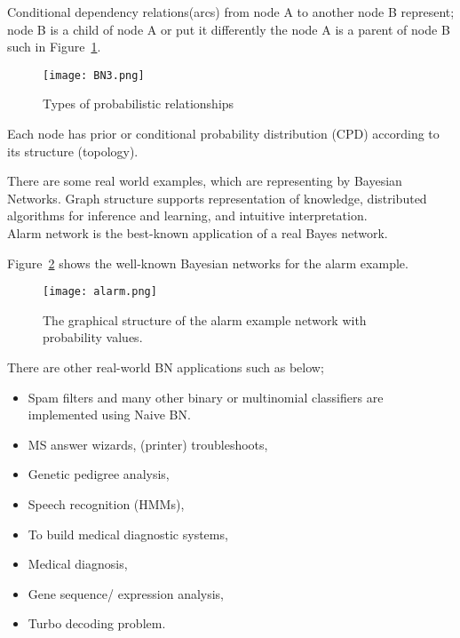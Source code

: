 \documentclass[a4,12pt]{ozu-thesis}
\begin{document}
 Conditional dependency relations(arcs) from node A to another node B represent; node B is a child of node A or put it differently the node A is a parent of node B such in Figure~\ref{fig:prob}.


\begin{figure}[h]
\begin{center}
\texttt{[image: BN3.png]}
\end{center}
\caption{Types of probabilistic relationships \cite{cmu1}}
\label{fig:prob}
\end{figure}

 Each node has prior or conditional probability distribution (CPD) according to its structure (topology).


 There are some real world examples, which are representing by Bayesian Networks.
 Graph structure supports representation of knowledge, distributed algorithms for inference and learning, and intuitive interpretation.
 \\ Alarm network is the best-known application of a real Bayes network.
 
Figure~\ref{fig:alarm} shows the well-known Bayesian networks for the alarm example.

\begin{figure}[h]
\begin{center}
\texttt{[image: alarm.png]}
\end{center}
\caption{The graphical structure of the alarm example network with probability values.}
\label{fig:alarm}
\end{figure}

 There are other  real-world BN applications such as below;
 

\begin{itemize}
\item Spam filters and many other binary or multinomial classifiers are implemented using Naive BN.
\item MS answer wizards, (printer) troubleshoots,
\item Genetic pedigree analysis,
\item Speech recognition (HMMs),
\item To build medical diagnostic systems,
\item Medical diagnosis,
\item Gene sequence/ expression analysis,
\item Turbo decoding problem.
\end{itemize}
\end{document}
